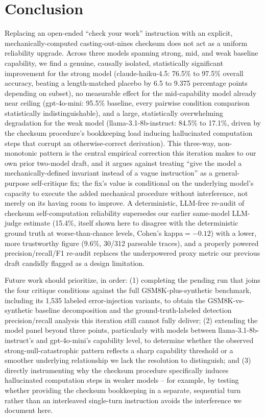\documentclass[11pt,letterpaper]{article}
\begin{document}
\section{Conclusion}

Replacing an open-ended ``check your work'' instruction with an explicit, mechanically-computed casting-out-nines checksum does not act as a uniform reliability upgrade. Across three models spanning strong, mid, and weak baseline capability, we find a genuine, causally isolated, statistically significant improvement for the strong model (claude-haiku-4.5: 76.5\% to 97.5\% overall accuracy, beating a length-matched placebo by 6.5 to 9.375 percentage points depending on subset), no measurable effect for the mid-capability model already near ceiling (gpt-4o-mini: 95.5\% baseline, every pairwise condition comparison statistically indistinguishable), and a large, statistically overwhelming degradation for the weak model (llama-3.1-8b-instruct: 84.5\% to 17.1\%, driven by the checksum procedure's bookkeeping load inducing hallucinated computation steps that corrupt an otherwise-correct derivation). This three-way, non-monotonic pattern is the central empirical correction this iteration makes to our own prior two-model draft, and it argues against treating ``give the model a mechanically-defined invariant instead of a vague instruction'' as a general-purpose self-critique fix; the fix's value is conditional on the underlying model's capacity to execute the added mechanical procedure without interference, not merely on its having room to improve. A deterministic, LLM-free re-audit of checksum self-computation reliability supersedes our earlier same-model LLM-judge estimate (15.4\%, itself shown here to disagree with the deterministic ground truth at worse-than-chance levels, Cohen's kappa$=-0.12$) with a lower, more trustworthy figure (9.6\%, 30/312 parseable traces), and a properly powered precision/recall/F1 re-audit replaces the underpowered proxy metric our previous draft candidly flagged as a design limitation.

Future work should prioritize, in order: (1) completing the pending run that joins the four critique conditions against the full GSM8K-plus-synthetic benchmark, including its 1,535 labeled error-injection variants, to obtain the GSM8K-vs-synthetic baseline decomposition and the ground-truth-labeled detection precision/recall analysis this iteration still cannot fully deliver; (2) extending the model panel beyond three points, particularly with models between llama-3.1-8b-instruct's and gpt-4o-mini's capability level, to determine whether the observed strong-null-catastrophic pattern reflects a sharp capability threshold or a smoother underlying relationship we lack the resolution to distinguish; and (3) directly instrumenting why the checksum procedure specifically induces hallucinated computation steps in weaker models -- for example, by testing whether providing the checksum bookkeeping in a separate, sequential turn rather than an interleaved single-turn instruction avoids the interference we document here.
\end{document}
